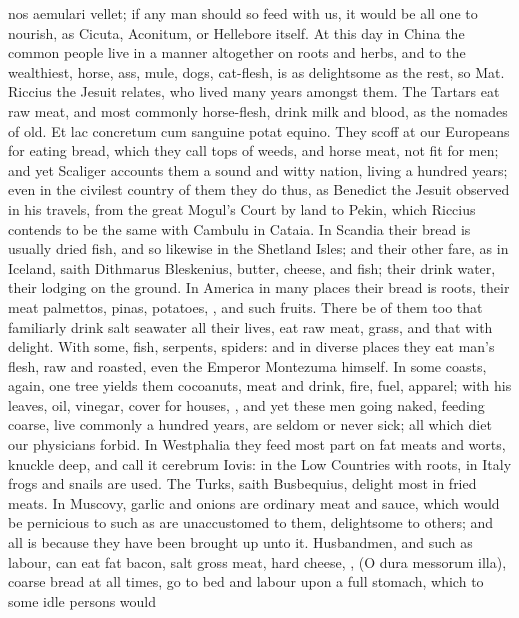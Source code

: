 {{nos aemulari vellet; if any man should so feed with us, it would be all
one to nourish, as Cicuta, Aconitum, or Hellebore itself. At this day
in China the common people live in a manner altogether on roots and
herbs, and to the wealthiest, horse, ass, mule, dogs, cat-flesh, is as
delightsome as the rest, so Mat. Riccius the Jesuit relates, who
lived many years amongst them. The Tartars eat raw meat, and most
commonly horse-flesh, drink milk and blood, as the nomades of
old. Et lac concretum cum sanguine potat equino. They scoff at our
Europeans for eating bread, which they call tops of weeds, and horse
meat, not fit for men; and yet Scaliger accounts them a sound and witty
nation, living a hundred years; even in the civilest country of them
they do thus, as Benedict the Jesuit observed in his travels, from the
great Mogul's Court by land to Pekin, which Riccius contends to be the
same with Cambulu in Cataia. In Scandia their bread is usually dried
fish, and so likewise in the Shetland Isles; and their other fare, as
in Iceland, saith Dithmarus Bleskenius, butter, cheese, and fish;
their drink water, their lodging on the ground. In America in many
places their bread is roots, their meat palmettos, pinas, potatoes,
\etc{}, and such fruits. There be of them too that familiarly drink
salt seawater all their lives, eat raw meat, grass, and
that with delight. With some, fish, serpents, spiders: and in diverse
places they eat man's flesh, raw and roasted, even the Emperor
Montezuma himself. In some coasts, again, one tree yields
them cocoanuts, meat and drink, fire, fuel, apparel; with his leaves,
oil, vinegar, cover for houses, \etc{}, and yet these men going naked,
feeding coarse, live commonly a hundred years, are seldom or never
sick; all which diet our physicians forbid. In Westphalia they feed
most part on fat meats and worts, knuckle deep, and call it
cerebrum Iovis: in the Low Countries with roots, in Italy frogs
and snails are used. The Turks, saith Busbequius, delight most in fried
meats. In Muscovy, garlic and onions are ordinary meat and sauce, which
would be pernicious to such as are unaccustomed to them, delightsome to
others; and all is because they have been brought up unto it.
Husbandmen, and such as labour, can eat fat bacon, salt gross meat,
hard cheese, \etc{}, (O dura messorum illa), coarse bread at all times, go
to bed and labour upon a full stomach, which to some idle persons would
}}
